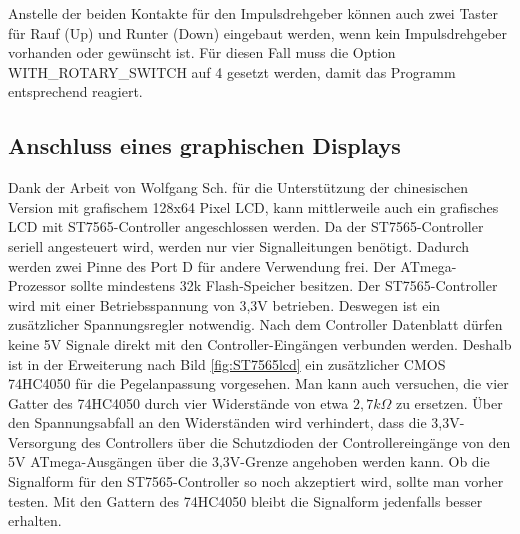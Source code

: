 Anstelle der beiden Kontakte für den Impulsdrehgeber können auch zwei Taster für Rauf (Up) und Runter (Down)
eingebaut werden, wenn kein Impulsdrehgeber vorhanden oder gewünscht ist.
Für diesen Fall muss die Option WITH\_ROTARY\_SWITCH auf 4 gesetzt werden, damit das Programm
entsprechend reagiert.

\subsection{Anschluss eines graphischen Displays}

Dank der Arbeit von Wolfgang Sch. für die Unterstützung der chinesischen Version mit
grafischem 128x64 Pixel LCD, kann mittlerweile auch ein grafisches LCD
mit ST7565-Controller angeschlossen werden. Da der ST7565-Controller seriell angesteuert wird,
werden nur vier Signalleitungen benötigt.
Dadurch werden zwei Pinne des Port D für andere Verwendung frei.
Der ATmega-Prozessor sollte mindestens 32k Flash-Speicher besitzen.
Der ST7565-Controller wird mit einer Betriebsspannung von 3,3V betrieben.
Deswegen ist ein zusätzlicher Spannungsregler notwendig.
Nach dem Controller Datenblatt dürfen keine 5V Signale direkt mit den Controller-Eingängen verbunden
werden. Deshalb ist in der Erweiterung nach Bild \ref{fig:ST7565lcd} ein zusätzlicher CMOS 74HC4050
für die Pegelanpassung vorgesehen. 
Man kann auch versuchen, die vier Gatter des 74HC4050 durch vier Widerstände von etwa \(2,7k\Omega\) zu ersetzen.
Über den Spannungsabfall an den Widerständen wird verhindert, dass die 3,3V-Versorgung des Controllers über die Schutzdioden
der Controllereingänge von den 5V ATmega-Ausgängen über die 3,3V-Grenze angehoben werden kann.
Ob die Signalform für den ST7565-Controller so noch akzeptiert wird, sollte man vorher testen.
Mit den Gattern des 74HC4050 bleibt die Signalform jedenfalls besser erhalten.\\
 
